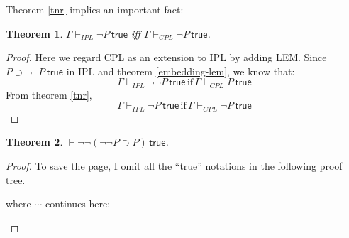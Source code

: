 \documentclass{article}
\newtheorem{theorem}{Theorem}[section]
\newcommand{\true}{\,\textsf{true}}
\begin{document}
Theorem \ref{tnr} implies an important fact:
\begin{theorem}
    $\Gamma \vdash_{IPL} \neg P \true$ \emph{iff} $\Gamma \vdash_{CPL} \neg P \true$.
\end{theorem}
\begin{proof}
    Here we regard CPL as an extension to IPL by adding LEM.
    Since $P\supset \neg\neg P\true$ in IPL and theorem \ref{embedding-lem}, we know that:
    \[
        \Gamma \vdash_{IPL} \neg\neg P\true \, \text{if}\, \Gamma \vdash_{CPL} P\true
    \]
    From theorem \ref{tnr},
    \[
        \Gamma \vdash_{IPL} \neg P\true \, \text{if}\, \Gamma \vdash_{CPL} \neg P\true
    \]
\end{proof}

\begin{theorem}
    $\vdash \neg\neg (\neg\neg P\supset P)\true$.
\end{theorem}
\begin{proof}
    To save the page, I omit all the ``\textsf{true}'' notations in the following proof tree.
    \begin{mathpar}
    \end{mathpar}
    where $\cdots$ continues here:
    \begin{mathpar}

    \end{mathpar}
\end{proof}
\end{document}
